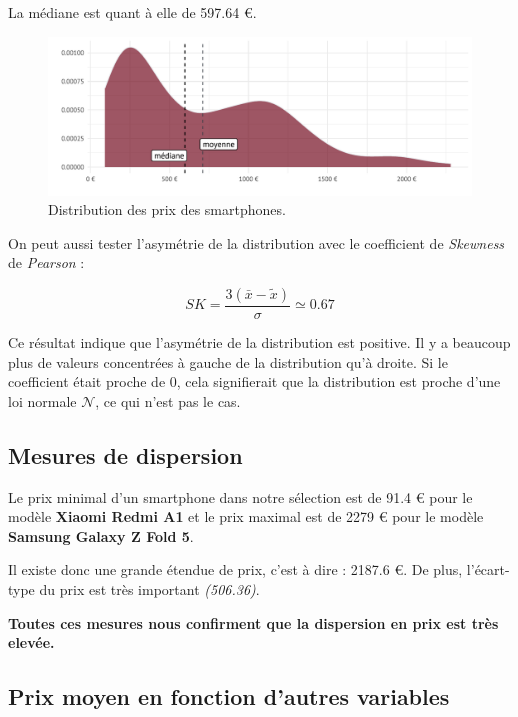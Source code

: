 \documentclass[
  12pt,
]{report}
\begin{document}
La médiane est quant à elle de 597.64 €.

\begin{figure}[H]

{\centering \includegraphics{report_files/figure-pdf/density_phones-1.pdf}

}

\caption{Distribution des prix des smartphones.}

\end{figure}%

On peut aussi tester l'asymétrie de la distribution avec le coefficient
de \emph{Skewness} de \emph{Pearson} :

\[SK = \dfrac{3(\bar{x} - \tilde{x})}{\sigma} \simeq 0.67\]

Ce résultat indique que l'asymétrie de la distribution est positive. Il
y a beaucoup plus de valeurs concentrées à gauche de la distribution
qu'à droite. Si le coefficient était proche de 0, cela signifierait que
la distribution est proche d'une loi normale \(\mathcal{N}\), ce qui
n'est pas le cas.

\subsection{Mesures de dispersion}\label{mesures-de-dispersion}

Le prix minimal d'un smartphone dans notre sélection est de 91.4 € pour
le modèle \textbf{Xiaomi Redmi A1} et le prix maximal est de 2279 € pour
le modèle \textbf{Samsung Galaxy Z Fold 5}.

Il existe donc une grande étendue de prix, c'est à dire : 2187.6 €. De
plus, l'écart-type du prix est très important \emph{(506.36)}.

\textbf{Toutes ces mesures nous confirment que la dispersion en prix est
très elevée.}

\subsection{Prix moyen en fonction d'autres
variables}\label{prix-moyen-en-fonction-dautres-variables}
\end{document}
